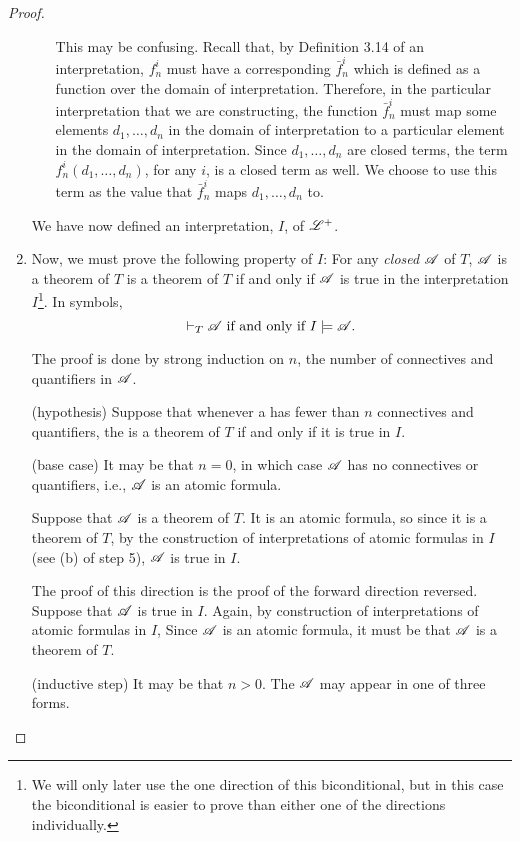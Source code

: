 \begin{proposition}
\begin{proof}
\begin{enumerate}
\begin{enumerate}
              This may be confusing. Recall that, by Definition 3.14 of an interpretation, \(f^i_n\) must have a corresponding \(\bar{f}^i_n\) which is defined as a function over the domain of interpretation. Therefore, in the particular interpretation that we are constructing, the function \(\bar{f}^i_n\) must map some elements \(d_1, \dots, d_n\) in the domain of interpretation to a particular element in the domain of interpretation. Since \(d_1, \dots, d_n\) are closed terms, the term \(f^i_n(d_1, \dots, d_n)\), for any \(i\), is a closed term as well. We choose to use this term as the value that \(\bar{f}^i_n\) maps \(d_1, \dots, d_n\) to.
          \end{enumerate}
          We have now defined an interpretation, \(I\), of \(\mathscr{L}^+\).

        \item Now, we must prove the following property of \(I\): For any \textit{closed} \wf{} \(\mathscr{A}\) of \(T\), \(\mathscr{A}\) is a theorem of \(T\) is a theorem of \(T\) if and only if \(\mathscr{A}\) is true in the interpretation \(I\)\footnote{We will only later use the one direction of this biconditional, but in this case the biconditional is easier to prove than either one of the directions individually.}. In symbols,
          \[\vdash_{T} \mathscr{A} \text{ if and only if } I \models \mathscr{A}.\]

          The proof is done by strong induction on \(n\), the number of connectives and quantifiers in \(\mathscr{A}\).

          (hypothesis) Suppose that whenever a \wf{} has fewer than \(n\) connectives and quantifiers, the \wf{} is a theorem of \(T\) if and only if it is true in \(I\).

          (base case) It may be that \(n = 0\), in which case \(\mathscr{A}\) has no connectives or quantifiers, i.e., \(\mathscr{A}\) is an atomic formula. 

          \Ra{} Suppose that \(\mathscr{A}\) is a theorem of \(T\). It is an atomic formula, so since it is a theorem of \(T\), by the construction of interpretations of atomic formulas in \(I\) (see (b) of step 5), \(\mathscr{A}\) is true in \(I\).

          \La{} The proof of this direction is the proof of the forward direction reversed. Suppose that \(\mathscr{A}\) is true in \(I\). Again, by construction of interpretations of atomic formulas in \(I\), Since \(\mathscr{A}\) is an atomic formula, it must be that \(\mathscr{A}\) is a theorem of \(T\).
          
          (inductive step) It may be that \(n > 0\). The \wf{} \(\mathscr{A}\) may appear in one of three forms.


\end{enumerate}
\end{proof}
\end{proposition}
